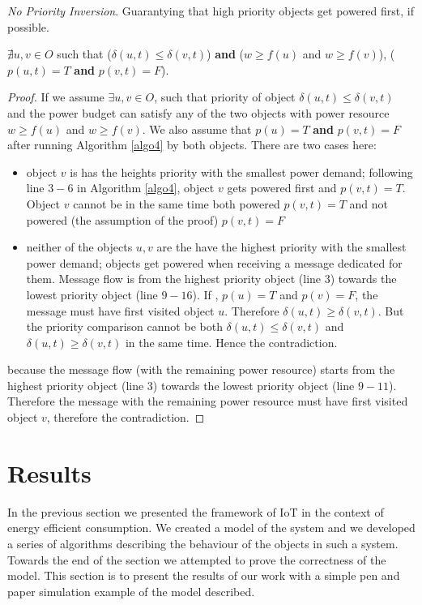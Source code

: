 \documentclass[letterpaper, 10 pt, conference]{ieeeconf}
\begin{document}
\begin{theorem}
\emph{No Priority Inversion}. Guarantying that high priority objects get powered first, if possible.
\end{theorem}
\begin{lemma}\label{lemma2}
      $\nexists u,v \in O$ such that ($\delta(u,t) \le \delta(v,t)$) \textbf{and} ($w\geq f(u)$ and $w\geq f(v)$), ($ p(u,t)=T$ \textbf{and} $p(v,t)=F$).
\end{lemma}

\begin{proof}
    If we assume $\exists u, v \in O$, such that priority of object $\delta(u,t) \le \delta(v,t)$ and the power budget can satisfy any of the two objects with power resource $w\geq f(u)$ and $w\geq f(v)$. We also assume that $p(u) = T$ \textbf{and} $p(v,t) = F$ after running Algorithm \ref{algo4} by both objects. There are two cases here:
    \begin{itemize}
      \item object $v$ is has the heights priority with the smallest power demand; following line $3-6$ in Algorithm \ref{algo4}, object $v$ gets powered first and $p(v,t) = T$. Object $v$ cannot be in the same time both powered $p(v,t) = T$ and not powered (the assumption of the proof) $p(v,t) = F$
      \item neither of the objects $u,v$ are the have the highest priority with the smallest power demand; objects get powered when receiving a message dedicated for them. Message flow is from the highest priority object (line $3$) towards the lowest priority object (line $9-16$). If , $p(u) = T$ and $p(v) = F$, the message must have first visited object $u$. Therefore $\delta(u,t) \ge \delta(v,t)$. But the priority comparison cannot be both $\delta(u,t) \le \delta(v,t)$ and $\delta(u,t) \geq \delta(v,t)$ in the same time. Hence the contradiction.
    \end{itemize}
    because the message flow (with the remaining power resource) starts from the highest priority object (line $3$) towards the lowest priority object (line $9-11$). Therefore the message with the remaining power resource must have first visited object $v$, therefore the contradiction.
\end{proof}

\section{Results} \label{results}
In the previous section we presented the framework of IoT in the context of energy efficient consumption. We created a model of the system and we developed a series of algorithms describing the behaviour of the objects in such a system. Towards the end of the section we attempted to prove the correctness of the model. This section is to present the results of our work with a simple pen and paper simulation example of the model described.
\end{document}
